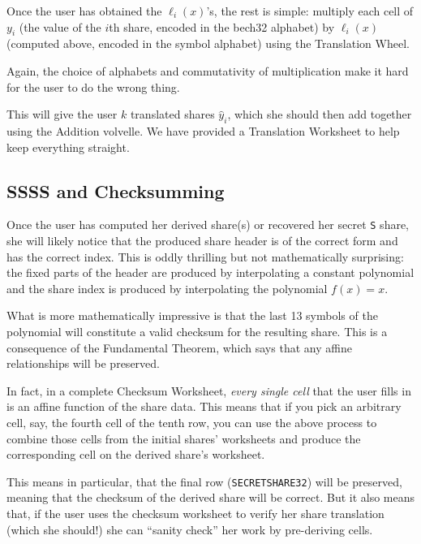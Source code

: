 \documentclass[letterpaper]{article}
\newcommand{\vc}[1]{\texttt{#1}} %
\begin{document}
Once the user has obtained the $\ell_i(x)$'s, the rest is simple: multiply each
cell of $y_i$ (the value of the $i$th share, encoded in the bech32 alphabet) by
$\ell_i(x)$ (computed above, encoded in the symbol alphabet) using the Translation
Wheel.

Again, the choice of alphabets and commutativity of multiplication make it hard
for the user to do the wrong thing.

This will give the user $k$ translated shares $\hat{y}_i$, which she should then
add together using the Addition volvelle. We have provided a Translation Worksheet
to help keep everything straight.

\subsection{SSSS and Checksumming}

Once the user has computed her derived share(s) or recovered her secret \vc{S}
share, she will likely notice that the produced share header is of the correct form
and has the correct index. This is oddly thrilling but not mathematically surprising:
the fixed parts of the header are produced by interpolating a constant polynomial
and the share index is produced by interpolating the polynomial $f(x) = x$.

What is more mathematically impressive is that the last 13 symbols of the polynomial
will constitute a valid checksum for the resulting share. This is a consequence of
the Fundamental Theorem, which says that any affine relationships will be preserved.

In fact, in a complete Checksum Worksheet, \emph{every single cell} that the user
fills in is an affine function of the share data. This means that if you pick an
arbitrary cell, say, the fourth cell of the tenth row, you can use the above process
to combine those cells from the initial shares' worksheets and produce the
corresponding cell on the derived share's worksheet.

This means in particular, that the final row (\vc{SECRETSHARE32}) will be
preserved, meaning that the checksum of the derived share will be correct. But it
also means that, if the user uses the checksum worksheet to verify her share
translation (which she should!) she can ``sanity check'' her work by pre-deriving
cells.
\end{document}
